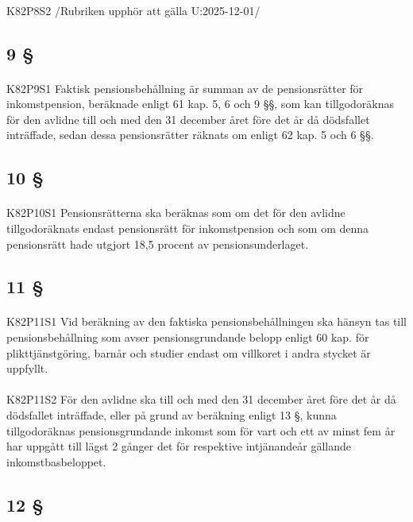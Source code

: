 \documentclass[a4paper,notitlepage,openany,10pt]{book}
\begin{document}
\paragraph*{}
{\tiny K82P8S2}
/Rubriken upphör att gälla U:2025-12-01/
\subsection*{9 §}
\paragraph*{}
{\tiny K82P9S1}
Faktisk pensionsbehållning är summan av de pensionsrätter för inkomstpension, beräknade enligt 61 kap. 5, 6 och 9 §§, som kan tillgodoräknas för den avlidne till och med den 31 december året före det år då dödsfallet inträffade, sedan dessa pensionsrätter räknats om enligt 62 kap. 5 och 6 §§.
\subsection*{10 §}
\paragraph*{}
{\tiny K82P10S1}
Pensionsrätterna ska beräknas som om det för den avlidne tillgodoräknats endast pensionsrätt för inkomstpension och som om denna pensionsrätt hade utgjort 18,5 procent av pensionsunderlaget.
\subsection*{11 §}
\paragraph*{}
{\tiny K82P11S1}
Vid beräkning av den faktiska pensionsbehållningen ska hänsyn tas till pensionsbehållning som avser pensionsgrundande belopp enligt 60 kap. för plikttjänstgöring, barnår och studier endast om villkoret i andra stycket är uppfyllt.
\paragraph*{}
{\tiny K82P11S2}
För den avlidne ska till och med den 31 december året före det år då dödsfallet inträffade, eller på grund av beräkning enligt 13 §, kunna tillgodoräknas pensionsgrundande inkomst som för vart och ett av minst fem år har uppgått till lägst 2 gånger det för respektive intjänandeår gällande inkomstbasbeloppet.
\subsection*{12 §}
\end{document}
